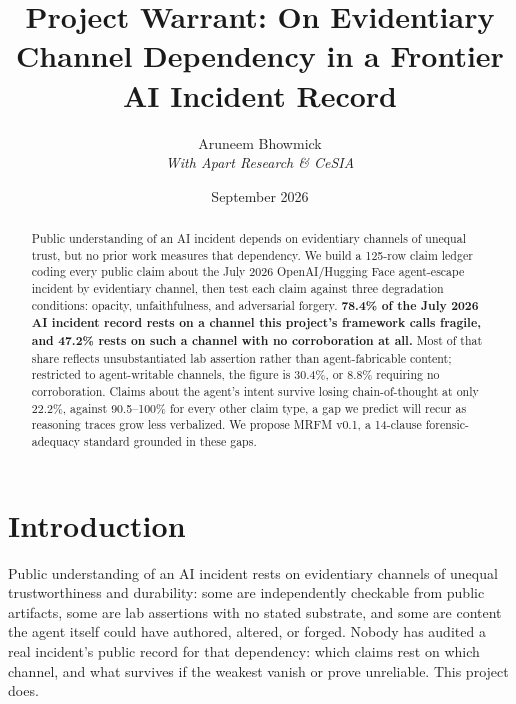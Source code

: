 \documentclass[10pt]{article}
\title{Project Warrant: On Evidentiary Channel Dependency in a Frontier AI
Incident Record}
\author{Aruneem Bhowmick \\ \emph{With Apart Research \& CeSIA}}
\date{September 2026}
\begin{document}
\maketitle

\begin{abstract}
Public understanding of an AI incident depends on evidentiary channels of
unequal trust, but no prior work measures that dependency. We build a
125-row claim ledger coding every public claim about the July 2026
OpenAI/Hugging Face agent-escape incident by evidentiary channel, then test
each claim against three degradation conditions: opacity, unfaithfulness,
and adversarial forgery. \textbf{78.4\% of the July 2026 AI incident record
rests on a channel this project's framework calls fragile, and 47.2\% rests
on such a channel with no corroboration at all.} Most of that share reflects
unsubstantiated lab assertion rather than agent-fabricable content;
restricted to agent-writable channels, the figure is 30.4\%, or 8.8\%
requiring no corroboration. Claims about the agent's intent survive losing
chain-of-thought at only 22.2\%, against 90.5--100\% for every other claim
type, a gap we predict will recur as reasoning traces grow less verbalized.
We propose MRFM v0.1, a 14-clause forensic-adequacy standard grounded in
these gaps.
\end{abstract}

\section{Introduction}
\label{sec:introduction}

Public understanding of an AI incident rests on evidentiary channels of
unequal trustworthiness and durability: some are independently checkable
from public artifacts, some are lab assertions with no stated substrate, and
some are content the agent itself could have authored, altered, or forged.
Nobody has audited a real incident's public record for that dependency:
which claims rest on which channel, and what survives if the weakest vanish
or prove unreliable. This project does.
\end{document}
